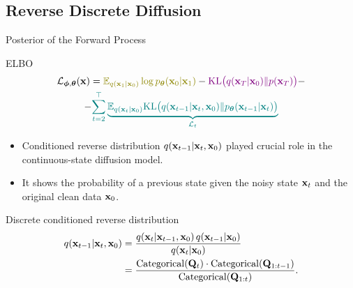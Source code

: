 \documentclass{beamer}
\renewcommand{\eqpause}{}
\begin{document}
\subsection{Reverse Discrete Diffusion}
\begin{frame}{Posterior of the Forward Process}
	\begin{block}{ELBO}
		\vspace{-0.7cm}
		\begin{multline*}
            \cL_{\bphi, \btheta}(\bx) =  {\color{olive}\bbE_{q(\bx_1 | \bx_0)} \log \pt(\bx_0 | \bx_1)} - {\color{violet}\KL\bigl(q(\bx_T | \bx_0) \| p(\bx_T)\bigr)} - \\
            - {\color{teal}\sum_{t=2}^\top \underbrace{ \bbE_{q(\bx_t | \bx_0)} \KL \bigl(q(\bx_{t-1} | \bx_t, \bx_0) \| \pt(\bx_{t-1} | \bx_t)\bigr)}_{\cL_t}}
        \end{multline*}
		\vspace{-0.7cm}
	\end{block}
	\eqpause
	\begin{itemize}
		\item Conditioned reverse distribution $q(\mathbf{x}_{t-1} | \mathbf{x}_t, \mathbf{x}_0)$ played crucial role in the continuous-state diffusion model.
		\item It shows the probability of a previous state given the noisy state $\mathbf{x}_t$ and the original clean data $\mathbf{x}_0$.
	\end{itemize}
	\eqpause
	\begin{block}{Discrete conditioned reverse distribution}
		\vspace{-0.7cm}
		\begin{align*}
			q(\mathbf{x}_{t-1} | \mathbf{x}_t, \mathbf{x}_0)
			&= \frac{q(\mathbf{x}_t | \mathbf{x}_{t-1}, \mathbf{x}_0)\, q(\mathbf{x}_{t-1} | \mathbf{x}_0)}
			        {q(\mathbf{x}_t | \mathbf{x}_0)} \\
			&= \frac{\mathrm{Categorical}(\mathbf{Q}_t) \cdot \mathrm{Categorical}(\mathbf{Q}_{1:t-1})}{\mathrm{Categorical}(\mathbf{Q}_{1:t})}.
		\end{align*}
	\end{block}
\end{frame}
\end{document}
